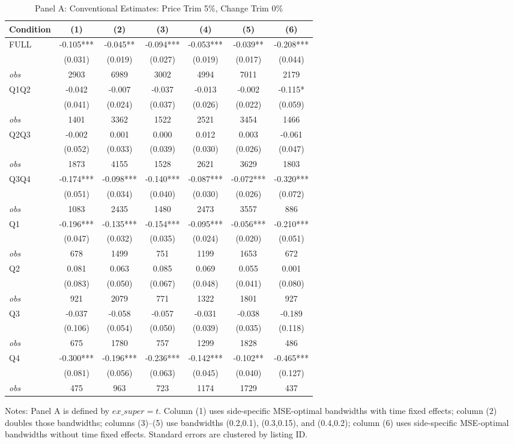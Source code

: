 \begin{table}[!htbp]
\centering
\caption{Panel A: Conventional Estimates: Price Trim 5\%, Change Trim 0\%}
\begin{tabular}{lcccccc}
\hline
Condition & (1) & (2) & (3) & (4) & (5) & (6) \\
\hline
FULL & -0.105*** & -0.045** & -0.094*** & -0.053*** & -0.039** & -0.208*** \\
 & (0.031) & (0.019) & (0.027) & (0.019) & (0.017) & (0.044) \\
\textit{obs} & 2903 & 6989 & 3002 & 4994 & 7011 & 2179 \\
Q1Q2 & -0.042 & -0.007 & -0.037 & -0.013 & -0.002 & -0.115* \\
 & (0.041) & (0.024) & (0.037) & (0.026) & (0.022) & (0.059) \\
\textit{obs} & 1401 & 3362 & 1522 & 2521 & 3454 & 1466 \\
Q2Q3 & -0.002 & 0.001 & 0.000 & 0.012 & 0.003 & -0.061 \\
 & (0.052) & (0.033) & (0.039) & (0.030) & (0.026) & (0.047) \\
\textit{obs} & 1873 & 4155 & 1528 & 2621 & 3629 & 1803 \\
Q3Q4 & -0.174*** & -0.098*** & -0.140*** & -0.087*** & -0.072*** & -0.320*** \\
 & (0.051) & (0.034) & (0.040) & (0.030) & (0.026) & (0.072) \\
\textit{obs} & 1083 & 2435 & 1480 & 2473 & 3557 & 886 \\
Q1 & -0.196*** & -0.135*** & -0.154*** & -0.095*** & -0.056*** & -0.210*** \\
 & (0.047) & (0.032) & (0.035) & (0.024) & (0.020) & (0.051) \\
\textit{obs} & 678 & 1499 & 751 & 1199 & 1653 & 672 \\
Q2 & 0.081 & 0.063 & 0.085 & 0.069 & 0.055 & 0.001 \\
 & (0.083) & (0.050) & (0.067) & (0.048) & (0.041) & (0.080) \\
\textit{obs} & 921 & 2079 & 771 & 1322 & 1801 & 927 \\
Q3 & -0.037 & -0.058 & -0.057 & -0.031 & -0.038 & -0.189 \\
 & (0.106) & (0.054) & (0.050) & (0.039) & (0.035) & (0.118) \\
\textit{obs} & 675 & 1780 & 757 & 1299 & 1828 & 486 \\
Q4 & -0.300*** & -0.196*** & -0.236*** & -0.142*** & -0.102** & -0.465*** \\
 & (0.081) & (0.056) & (0.063) & (0.045) & (0.040) & (0.127) \\
\textit{obs} & 475 & 963 & 723 & 1174 & 1729 & 437 \\
\hline
\end{tabular}
\begin{minipage}{0.98\textwidth}\footnotesize
Notes: Panel A is defined by $ex\_super=t$. Column (1) uses side-specific MSE-optimal bandwidths with time fixed effects; column (2) doubles those bandwidths; columns (3)--(5) use bandwidths (0.2,0.1), (0.3,0.15), and (0.4,0.2); column (6) uses side-specific MSE-optimal bandwidths without time fixed effects. Standard errors are clustered by listing ID.
\end{minipage}
\end{table}
